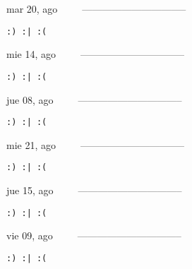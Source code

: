 \documentclass[letterpaper,10pt]{article}
\begin{document}
\begin{multicols}{3}
{mar 20, ago\ \ \ \ \ --------------------------------}
\begin{flushright}\begin{small}\texttt{:) :| :(}\end{small}\end{flushright}
\vfill
{mie 14, ago\ \ \ \ \ --------------------------------}
\begin{flushright}\begin{small}\texttt{:) :| :(}\end{small}\end{flushright}\par
\vfill
{jue 08, ago\ \ \ \ \ --------------------------------}
\begin{flushright}\begin{small}\texttt{:) :| :(}\end{small}\end{flushright}\par
\vfill
\end{multicols}
\vspace{1.05cm}

\begin{multicols}{3}
{mie 21, ago\ \ \ \ \ --------------------------------}
\begin{flushright}\begin{small}\texttt{:) :| :(}\end{small}\end{flushright}
\vfill
{jue 15, ago\ \ \ \ \ --------------------------------}
\begin{flushright}\begin{small}\texttt{:) :| :(}\end{small}\end{flushright}\par
\vfill
{vie 09, ago\ \ \ \ \ --------------------------------}
\begin{flushright}\begin{small}\texttt{:) :| :(}\end{small}\end{flushright}\par
\vfill
\end{multicols}
\vspace{1.05cm}
\end{document}
